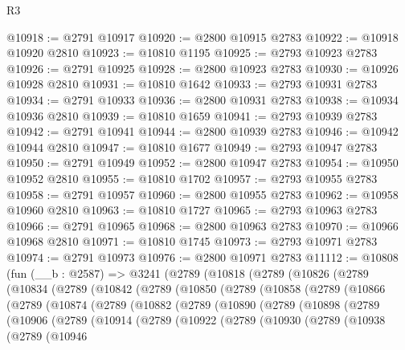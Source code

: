 \begin{lexlean}{R3}
\begin{coremodule}
@10918 := @2791 @10917
@10920 := @2800 @10915 @2783
@10922 := @10918 @10920 @2810
@10923 := @10810 @1195
@10925 := @2793 @10923 @2783
@10926 := @2791 @10925
@10928 := @2800 @10923 @2783
@10930 := @10926 @10928 @2810
@10931 := @10810 @1642
@10933 := @2793 @10931 @2783
@10934 := @2791 @10933
@10936 := @2800 @10931 @2783
@10938 := @10934 @10936 @2810
@10939 := @10810 @1659
@10941 := @2793 @10939 @2783
@10942 := @2791 @10941
@10944 := @2800 @10939 @2783
@10946 := @10942 @10944 @2810
@10947 := @10810 @1677
@10949 := @2793 @10947 @2783
@10950 := @2791 @10949
@10952 := @2800 @10947 @2783
@10954 := @10950 @10952 @2810
@10955 := @10810 @1702
@10957 := @2793 @10955 @2783
@10958 := @2791 @10957
@10960 := @2800 @10955 @2783
@10962 := @10958 @10960 @2810
@10963 := @10810 @1727
@10965 := @2793 @10963 @2783
@10966 := @2791 @10965
@10968 := @2800 @10963 @2783
@10970 := @10966 @10968 @2810
@10971 := @10810 @1745
@10973 := @2793 @10971 @2783
@10974 := @2791 @10973
@10976 := @2800 @10971 @2783
@11112 := @10808
    (fun (__b : @2587) =>
    @3241
      (@2789
        (@10818
          (@2789
            (@10826
              (@2789
                (@10834
                  (@2789
                    (@10842
                      (@2789
                        (@10850
                          (@2789
                            (@10858
                              (@2789
                                (@10866
                                  (@2789
                                    (@10874
                                      (@2789
                                        (@10882
                                          (@2789
                                            (@10890
                                              (@2789
                                                (@10898
                                                  (@2789
                                                    (@10906
                                                      (@2789
                                                        (@10914
                                                          (@2789
                                                            (@10922
                                                              (@2789
                                                                (@10930
                                                                  (@2789
                                                                    (@10938
                                                                      (@2789
                                                                        (@10946

\end{coremodule}
\end{lexlean}
